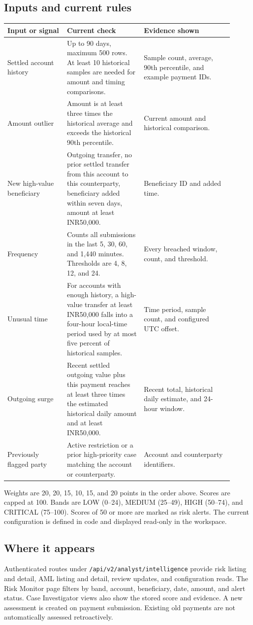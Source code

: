 \documentclass[11pt,a4paper]{article}
\newcommand{\inr}{\textsf{INR}}
\begin{document}
\subsection{Inputs and current rules}
\begin{longtable}{@{}p{0.24\linewidth}p{0.31\linewidth}p{0.36\linewidth}@{}}
\toprule
Input or signal & Current check & Evidence shown \\
\midrule
\endhead
Settled account history & Up to 90 days, maximum 500 rows. At least 10 historical samples are needed for amount and timing comparisons. & Sample count, average, 90th percentile, and example payment IDs. \\
Amount outlier & Amount is at least three times the historical average and exceeds the historical 90th percentile. & Current amount and historical comparison. \\
New high-value beneficiary & Outgoing transfer, no prior settled transfer from this account to this counterparty, beneficiary added within seven days, amount at least \inr 50,000. & Beneficiary ID and added time. \\
Frequency & Counts all submissions in the last 5, 30, 60, and 1,440 minutes. Thresholds are 4, 8, 12, and 24. & Every breached window, count, and threshold. \\
Unusual time & For accounts with enough history, a high-value transfer at least \inr 50,000 falls into a four-hour local-time period used by at most five percent of historical samples. & Time period, sample count, and configured UTC offset. \\
Outgoing surge & Recent settled outgoing value plus this payment reaches at least three times the estimated historical daily amount and at least \inr 50,000. & Recent total, historical daily estimate, and 24-hour window. \\
Previously flagged party & Active restriction or a prior high-priority case matching the account or counterparty. & Account and counterparty identifiers. \\
\bottomrule
\end{longtable}
Weights are 20, 20, 15, 10, 15, and 20 points in the order above. Scores are capped at 100. Bands are LOW (0--24), MEDIUM (25--49), HIGH (50--74), and CRITICAL (75--100). Scores of 50 or more are marked as risk alerts. The current configuration is defined in code and displayed read-only in the workspace.

\subsection{Where it appears}
Authenticated routes under \texttt{/api/v2/analyst/intelligence} provide risk listing and detail, AML listing and detail, review updates, and configuration reads. The Risk Monitor page filters by band, account, beneficiary, date, amount, and alert status. Case Investigator views also show the stored score and evidence. A new assessment is created on payment submission. Existing old payments are not automatically assessed retroactively.
\end{document}
